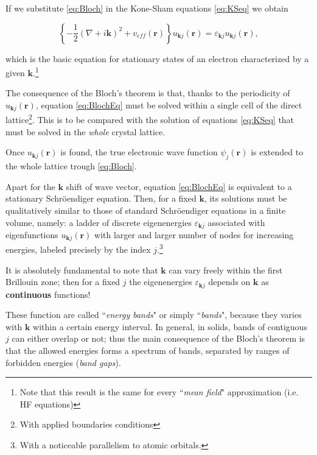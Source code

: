 \documentclass[a4paper,12pt]{article}
\newcommand\mf[1]{\mathbf{#1}}
\newcommand\erre{\mathbf{r}}
\begin{document}
If we substitute \eqref{eq:Bloch} in the Kone-Sham equations \eqref{eq:KSeq} we obtain \cite[p.137]{Manini}
\begin{framed}
\begin{equation}\label{eq:BlochEq}
	\left\lbrace -\frac{1}{2}  \left( \nabla + i\mf{k} \right)^2 + v_{eff}(\erre) \right\rbrace u_{\mf{k}j}(\erre) = \varepsilon_{\mf{k}j}  u_{\mf{k}j}(\erre),
\end{equation}
\end{framed}
which is the basic equation for stationary states of an electron characterized by a given $\mf{k}$.\footnote{Note that this result is the same for every ``\textit{mean field}" approximation (i.e. HF equations)}

The consequence of the Bloch's theorem is that, thanks to the periodicity of $u_{\mf{k}j}(\erre)$, equation \eqref{eq:BlochEq} must be solved within a single cell of the direct lattice\footnote{With applied boundaries conditions}.
This is to be compared with the solution of equations \eqref{eq:KSeq} that must be solved in the \textit{whole} crystal lattice.

Once $u_{\mf{k}j}(\erre)$ is found, the true electronic wave function $\psi_j(\erre)$ is extended to the whole lattice trough \eqref{eq:Bloch}.

Apart for the $\mf{k}$ shift of wave vector, equation \eqref{eq:BlochEq} is equivalent to a stationary Schr\"oendiger equation. Then, for a fixed $\mf{k}$, its solutions must be qualitatively similar to those of standard Schr\"oendiger equations in a finite volume, namely: a ladder of discrete eigenenergies $\varepsilon_{\mf{k}j}$ associated with eigenfunctions $u_{\mf{k}j}(\erre)$ with larger and larger number of nodes for increasing energies, labeled precisely by the index $j$.\footnote{With a noticeable parallelism to atomic orbitals.}

It is absolutely fundamental to note that $\mf{k}$ can vary freely within the first Brillouin zone; 
then for a fixed $j$ the eigenenergies $\varepsilon_{\mf{k}j}$ depends on $\mf{k}$ as \textbf{continuous} functions!

These function are called ``\textit{energy bands}" or simply ``\textit{bands}", because they varies with $\mf{k}$ within a certain energy interval. 
In general, in solids, bands of contiguous $j$ can either overlap or not; 
thus the main consequence of the Bloch's theorem is that the allowed energies forms a spectrum of bands, separated by ranges of forbidden energies (\textit{band gaps}).
\end{document}
